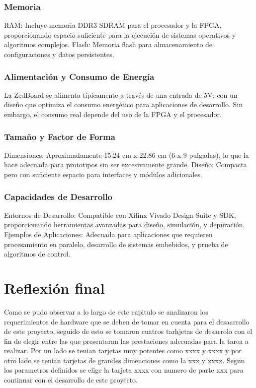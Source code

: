 \subsubsection{Memoria}
RAM: Incluye memoria DDR3 SDRAM para el procesador y la FPGA, proporcionando espacio suficiente para la ejecución de sistemas operativos y algoritmos complejos.
Flash: Memoria flash para almacenamiento de configuraciones y datos persistentes.
\subsubsection{Alimentación y Consumo de Energía}
La ZedBoard se alimenta típicamente a través de una entrada de 5V, con un diseño que optimiza el consumo energético para aplicaciones de desarrollo. Sin embargo, el consumo real depende del uso de la FPGA y el procesador.
\subsubsection{Tamaño y Factor de Forma}
Dimensiones: Aproximadamente 15.24 cm x 22.86 cm (6 x 9 pulgadas), lo que la hace adecuada para prototipos sin ser excesivamente grande.
Diseño: Compacta pero con suficiente espacio para interfaces y módulos adicionales.
\subsubsection{Capacidades de Desarrollo}
Entornos de Desarrollo: Compatible con Xilinx Vivado Design Suite y SDK, proporcionando herramientas avanzadas para diseño, simulación, y depuración.
Ejemplos de Aplicaciones: Adecuada para aplicaciones que requieren procesamiento en paralelo, desarrollo de sistemas embebidos, y prueba de algoritmos de control.

\section{Reflexión final}

Como se pudo observar a lo largo de este capitulo se analizaron los requerimientos de hardware que se deben de tomar en cuenta para el desaarrollo de este proyecto, seguido de esto se tomaron cuatros tarhjetas de desarrolo con el fin de elegir entre las que presentaran las prestaciones adecuadas para la tarea a realizar. Por un lado se tenian tarjetas muy potentes como xxxx y xxxx y por otro lado se tenian tarjetas de grandes dimenciones como la xxx y xxxx. Segun los parametros definidos se elige la tarjeta xxxx con numero de parte xxx para continuar con el desarrollo de este proyecto.